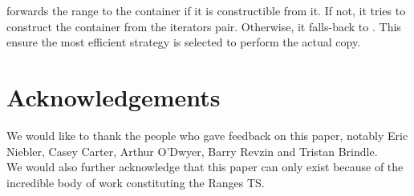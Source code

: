\documentclass{wg21}
\begin{document}
 forwards the range to the container if it is constructible from it. 
If not, it tries to construct the container from the  iterators pair.
Otherwise, it falls-back to .
This ensure the most efficient strategy is selected to perform the actual copy.


\section{Acknowledgements}
We would like to thank the people who gave feedback on this paper, notably Eric Niebler, Casey Carter, Arthur O'Dwyer, Barry Revzin
and Tristan Brindle.\\
We would also further acknowledge that this paper can only exist because of the incredible body of work constituting the Ranges TS.
\end{document}
